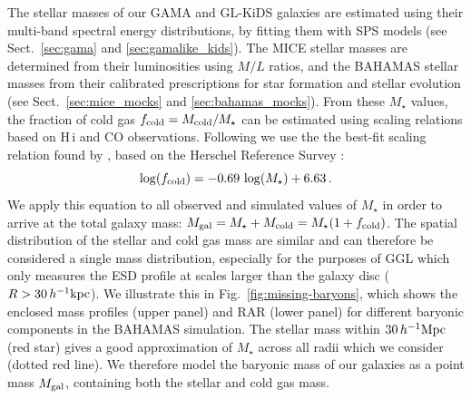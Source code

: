 \documentclass[usenatbib]{mnras}
\newcommand{\hkpc}{\, h^{-1}{\rm{kpc}} }
\newcommand{\hMpc}{\, h^{-1}{\rm{Mpc}} }
\newcommand{\un}[1]{_{\rm #1}}
\begin{document}
The stellar masses of our GAMA and GL-KiDS galaxies are estimated using their multi-band spectral energy distributions, by fitting them with SPS models (see Sect.~\ref{sec:gama} and \ref{sec:gamalike_kids}). The MICE stellar masses are determined from their luminosities using \cite{bell2001} $M/L$ ratios, and the BAHAMAS stellar masses from their calibrated prescriptions for star formation and stellar evolution (see Sect.~\ref{sec:mice_mocks} and \ref{sec:bahamas_mocks}). From these $M_\star$ values, the fraction of cold gas $f\un{cold} = M\un{cold}/M_\star$ can be estimated using scaling relations based on H\,{\sc i} and CO observations. Following \cite{brouwer2017} we use the the best-fit scaling relation found by \cite{boselli2014}, based on the  Herschel Reference Survey \cite[]{boselli2010}:
\begin{equation}\label{eq:fcold}
	\log(f\un{cold}) = -0.69 \, \log(M_\star) + 6.63 \, .
\end{equation}
We apply this equation to all observed and simulated values of $M_\star$ in order to arrive at the total galaxy mass: $M\un{gal} = M_\star + M\un{cold} = M_\star (1 + f\un{cold})$. The spatial distribution of the stellar and cold gas mass are similar \cite[]{pohlen2010,crocker2011,cooper2012,davis2013} and can therefore be considered a single mass distribution, especially for the purposes of GGL which only measures the ESD profile at scales larger than the galaxy disc ($R>30\hkpc$). We illustrate this in Fig.~\ref{fig:missing-baryons}, which shows the enclosed mass profiles (upper panel) and RAR (lower panel) for different baryonic components in the BAHAMAS simulation. The stellar mass within $30 \hMpc$ (red star) gives a good approximation of $M_\star$ across all radii which we consider (dotted red line). We therefore model the baryonic mass of our galaxies as a point mass $M\un{gal}$, containing both the stellar and cold gas mass.
\end{document}
